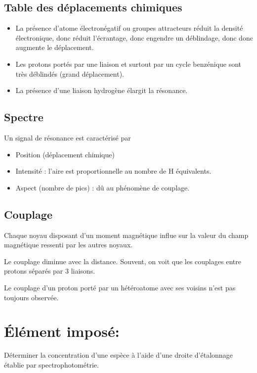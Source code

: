 \documentclass[11pt]{report}
\numberwithin{figure}{section}
\numberwithin{equation}{section}
\numberwithin{table}{section}
\newcommand{\1}{\boldsymbol{1}}
\begin{document}
\subsection{Table des déplacements chimiques}

\begin{itemize}
\item La présence d'atome électronégatif ou groupes attracteurs réduit la densité électronique, donc réduit l'écrantage, donc engendre un déblindage, donc donc augmente le déplacement.
\item Les protons portés par une liaison  et surtout par un cycle benzénique sont très déblindés (grand déplacement).
\item La présence d'une liaison hydrogène élargit la résonance.
\end{itemize}

\subsection{Spectre}

Un signal de résonance est caractérisé par
\begin{itemize}
\item Position (déplacement chimique)
\item Intensité : l'aire est proportionnelle au nombre de H équivalents. 
\item Aspect (nombre de pics) : dû au phénomène de couplage.
\end{itemize}

\subsection{Couplage}

Chaque noyau disposant d'un moment magnétique influe sur la valeur du champ magnétique ressenti par les autres noyaux.

Le couplage diminue avec la distance. Souvent, on voit que les couplages entre protons séparés par 3 liaisons.

Le couplage d'un proton porté par un hétéroatome avec ses voisins n'est pas toujours observée.


\section{Élément imposé:} Déterminer la concentration d'une espèce à
l'aide d'une droite d'étalonnage établie par spectrophotométrie.
\end{document}
